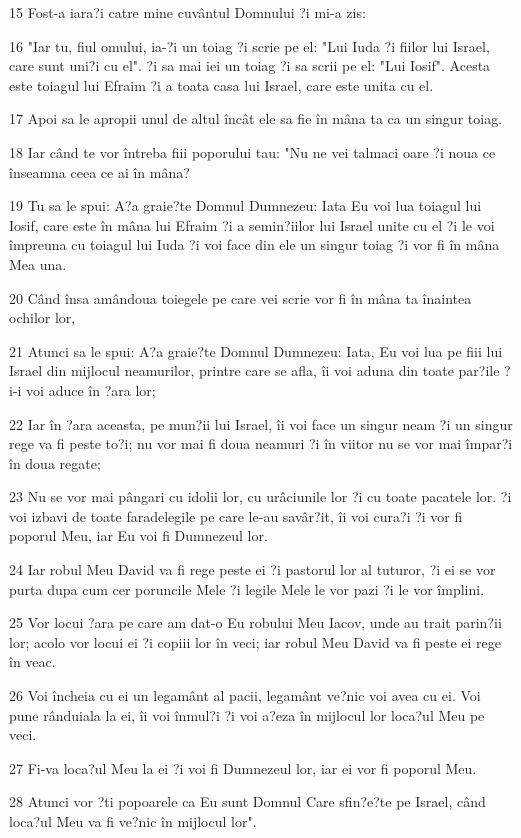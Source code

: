 \par 15 Fost-a iara?i catre mine cuvântul Domnului ?i mi-a zis:
\par 16 "Iar tu, fiul omului, ia-?i un toiag ?i scrie pe el: "Lui Iuda ?i fiilor lui Israel, care sunt uni?i cu el". ?i sa mai iei un toiag ?i sa scrii pe el: "Lui Iosif". Acesta este toiagul lui Efraim ?i a toata casa lui Israel, care este unita cu el.
\par 17 Apoi sa le apropii unul de altul încât ele sa fie în mâna ta ca un singur toiag.
\par 18 Iar când te vor întreba fiii poporului tau: "Nu ne vei talmaci oare ?i noua ce înseamna ceea ce ai în mâna?
\par 19 Tu sa le spui: A?a graie?te Domnul Dumnezeu: Iata Eu voi lua toiagul lui Iosif, care este în mâna lui Efraim ?i a semin?iilor lui Israel unite cu el ?i le voi împreuna cu toiagul lui Iuda ?i voi face din ele un singur toiag ?i vor fi în mâna Mea una.
\par 20 Când însa amândoua toiegele pe care vei scrie vor fi în mâna ta înaintea ochilor lor,
\par 21 Atunci sa le spui: A?a graie?te Domnul Dumnezeu: Iata, Eu voi lua pe fiii lui Israel din mijlocul neamurilor, printre care se afla, îi voi aduna din toate par?ile ?i-i voi aduce în ?ara lor;
\par 22 Iar în ?ara aceasta, pe mun?ii lui Israel, îi voi face un singur neam ?i un singur rege va fi peste to?i; nu vor mai fi doua neamuri ?i în viitor nu se vor mai împar?i în doua regate;
\par 23 Nu se vor mai pângari cu idolii lor, cu urâciunile lor ?i cu toate pacatele lor. ?i voi izbavi de toate faradelegile pe care le-au savâr?it, îi voi cura?i ?i vor fi poporul Meu, iar Eu voi fi Dumnezeul lor.
\par 24 Iar robul Meu David va fi rege peste ei ?i pastorul lor al tuturor, ?i ei se vor purta dupa cum cer poruncile Mele ?i legile Mele le vor pazi ?i le vor împlini.
\par 25 Vor locui ?ara pe care am dat-o Eu robului Meu Iacov, unde au trait parin?ii lor; acolo vor locui ei ?i copiii lor în veci; iar robul Meu David va fi peste ei rege în veac.
\par 26 Voi încheia cu ei un legamânt al pacii, legamânt ve?nic voi avea cu ei. Voi pune rânduiala la ei, îi voi înmul?i ?i voi a?eza în mijlocul lor loca?ul Meu pe veci.
\par 27 Fi-va loca?ul Meu la ei ?i voi fi Dumnezeul lor, iar ei vor fi poporul Meu.
\par 28 Atunci vor ?ti popoarele ca Eu sunt Domnul Care sfin?e?te pe Israel, când loca?ul Meu va fi ve?nic în mijlocul lor".


